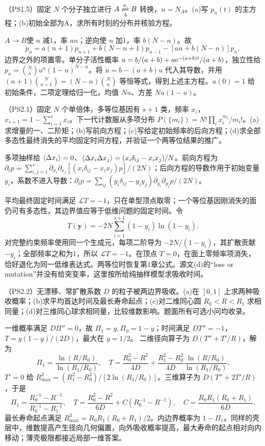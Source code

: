 \begin{exercise}
（PS1.5）固定 $N$ 个分子独立进行 $A\xrightleftharpoons[b]{a}B$ 转换，$n=N_A$。(a)写 $p_n(t)$ 的主方程；(b)初始全部为A，求所有时刻的分布并核验方程。
\end{exercise}
\begin{solution}
$A\to B$使 $n$ 减1，率 $an$；逆向使 $n$ 加1，率 $b(N-n)$。故
\[
\dot p_n=a(n+1)p_{n+1}+b(N-n+1)p_{n-1}-[an+b(N-n)]p_n,
\]
边界之外的项置零。单分子活性概率 $u=b/(a+b)+a\mathrm e^{-(a+b)t}/(a+b)$，独立性给 $p_n=\binom Nn u^n(1-u)^{N-n}$。将 $\dot u=b-(a+b)u$ 代入其导数，并用 $(n+1)\binom N{n+1}=(N-n)\binom Nn$ 等恒等式，得到上述主方程。$u(0)=1$ 给初始条件，二项定理给归一化，均值 $Nu$、方差 $Nu(1-u)$。
\end{solution}

\begin{exercise}
（PS2.1）固定 $N$ 个单倍体，多等位基因有 $s+1$ 类，频率 $x_i$，$x_{s+1}=1-\sum_{i=1}^sx_i$。下一代计数服从多项分布 $P(\{m_i\})=N!\prod_i x_i^{m_i}/m_i!$。(a)求增量的一、二阶矩；(b)写前向方程；(c)写给定初始频率的后向方程；(d)求全部多态性最终消失的平均固定时间方程，并验证一个两等位结果的推广。
\end{exercise}
\begin{solution}
多项抽样给 $\langle \Delta x_i\rangle=0$、$\langle \Delta x_i\Delta x_j\rangle=(x_i\delta_{ij}-x_ix_j)/N$。前向方程为 $\partial_t p=\sum_{i,j=1}^s\partial_{x_i}\partial_{x_j}[(x_i\delta_{ij}-x_ix_j)p]/(2N)$；后向方程的导数作用于初始变量 $y_i$，系数不进入导数：$\partial_t p=\sum_{ij}(y_i\delta_{ij}-y_iy_j)\partial_{y_i}\partial_{y_j}p/(2N)$。

平均最终固定时间满足 $\mathcal LT=-1$，只在单型顶点取零；一个等位基因刚消失的面仍可有多态性，其边界值应等于低维问题的固定时间。令
\[
T(\mathbf y)=-2N\sum_{i=1}^{s+1}(1-y_i)\ln(1-y_i).
\]
对完整约束频率使用同一个生成元，每项二阶导为 $-2N/(1-y_i)$，其扩散贡献 $-y_i$；全部频率之和为1，所以 $\mathcal LT=-1$。在顶点 $T=0$，在面上零频率项消失，恰好退化为同一低维表达式。两等位时恢复第1章公式。源文(d)的“loss or mutation”并没有给突变率，这里按所给纯抽样模型求吸收时间。
\end{solution}

\begin{exercise}
（PS2.2）无漂移、常扩散系数 $D$ 的粒子被两边界吸收。(a)在 $[0,1]$ 上求两种吸收概率；(b)求平均首达时间及最长寿命起点；(c)对二维同心圆 $R_0<R<R_1$ 求相同量；(d)对三维同心球求相同量，比较维数影响。题面所有可选小问均收录。
\end{exercise}
\begin{solution}
一维概率满足 $D\Pi''=0$，故 $\Pi_1=y,\Pi_0=1-y$；时间满足 $DT''=-1$，$T=y(1-y)/(2D)$，最大在 $y=1/2$。
二维径向算子为 $D(T''+T'/R)$，解为
\[
\Pi_1=\frac{\ln(R/R_0)}{\ln(R_1/R_0)},\quad
T=\frac{R_0^2-R^2}{4D}+\frac{R_1^2-R_0^2}{4D}\frac{\ln(R/R_0)}{\ln(R_1/R_0)}.
\]
$T'=0$ 给 $R_{\max}^2=(R_1^2-R_0^2)/[2\ln(R_1/R_0)]$。三维算子为 $D(T''+2T'/R)$，于是
\[
\Pi_1=\frac{R_0^{-1}-R^{-1}}{R_0^{-1}-R_1^{-1}},\quad
T=\frac{R_0^2-R^2}{6D}+C(R_0^{-1}-R^{-1}),\quad
C=\frac{R_0R_1(R_0+R_1)}{6D}.
\]
最长寿命起点满足 $R_{\max}^3=R_0R_1(R_0+R_1)/2$。内边界概率为 $1-\Pi_1$。同样的壳层中，维数提高产生径向几何偏置，向外吸收概率提高，最大寿命的起点相对向内移动；薄壳极限都接近局部一维答案。
\end{solution}

